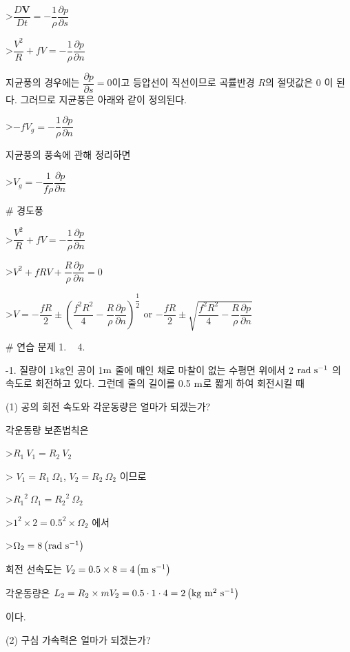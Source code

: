>$ \dfrac{D\mathbf{V}}{Dt} = - \dfrac{1}{\rho} \dfrac{\partial p}{\partial s}$

>$  \dfrac{V^{2}}{R} + fV = - \dfrac{1}{\rho} \dfrac{\partial p}{\partial n}$

지균풍의 경우에는 $\dfrac{\partial p}{\partial s} = 0$이고 등압선이 직선이므로 곡률반경 $R$의 절댓값은 $0$ 이 된다. 그러므로 지균풍은 아래와 같이 정의된다.

>$-f V_{g} = -\dfrac{1}{\rho}\dfrac{\partial p}{\partial n}$ 

지균풍의 풍속에 관해 정리하면

>$V_{g} = -\dfrac{1}{f \rho}\dfrac{\partial p}{\partial n}$ 



# 경도풍

>$  \dfrac{V^{2}}{R} + fV = - \dfrac{1}{\rho} \dfrac{\partial p}{\partial n}$

>$ V^{2} + fRV + \dfrac{R}{\rho} \dfrac{\partial p}{\partial n} = 0$

>$ V = -\dfrac{fR}{2} \pm \left( \dfrac{f^{2} R^{2}}{4} - \dfrac{R}{\rho}\dfrac{\partial p}{\partial n} \right)^{\dfrac{1}{2}} $ or $ - \dfrac{fR}{2} \pm \sqrt{ \dfrac{f^{2} R^{2}}{4} - \dfrac{R}{\rho}\dfrac{\partial p}{\partial n} }$



# 연습 문제 1. ~ 4.


-1. 질량이 1$\rm kg$인 공이 1$\rm m$ 줄에 매인 채로 마찰이 없는 수평면 위에서 2 $\rm rad ~ s^{-1}$ 의 속도로 회전하고 있다. 그런데 줄의 길이를 0.5 $\rm m$로 짧게 하여 회전시킬 때 

(1) 공의 회전 속도와 각운동량은 얼마가 되겠는가?

각운동량 보존법칙은 

>$ R_{1}~ V_{1} = R_{2}~ V_{2}$

> $ V_{1} = R_{1}~ \Omega_{1}$,  $ V_{2} = R_{2}~ \Omega_{2}$ 이므로

>$ {R_{1}}^{2}~ \Omega_{1} = {R_{2}}^{2}~ \Omega_{2}$

>$ {1}^2 \times 2 = {0.5}^2 \times \Omega_{2}$ 에서 

>$ \Omega_{2} = 8 \left( \rm rad ~ s^{-1} \right) $

회전 선속도는 
$ V_{2} = 0.5 \times 8 = 4 \left( \rm m ~ s^{-1} \right) $

각운동량은
$ {L}_{2} = R_{2} \times m V_{2} 
= 0.5 \cdot 1 \cdot 4 
= 2 \left( \rm kg ~ m^{2} ~ s^{-1} \right)$

이다.

(2) 구심 가속력은 얼마가 되겠는가?


